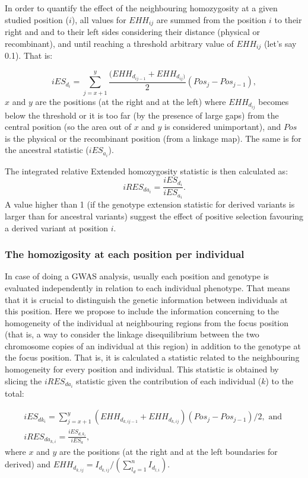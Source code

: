 \documentclass[a4paper,11pt]{article}
\begin{document}
In order to quantify the effect of the neighbouring homozygosity at a given studied position ($i$),  all values for $EHH_{ij}$ are summed from the position $i$ to their right and and to their left sides considering their distance (physical or recombinant), and until reaching a threshold arbitrary value of $EHH_{ij}$ (let's say 0.1). That is: 

\begin{equation}
 iES_{d_i} = \sum_{j=x+1}^{y}\frac{(EHH_{d_{ij-1}} + EHH_{d_{ij})}}{2} (Pos_{j} - Pos_{j-1}),
 \end{equation}
 $x$ and $y$ are the positions (at the right and at the left) where $EHH_{d_{ij}}$ becomes below the threshold or it is too far (by the presence of large gaps) from the central position (so the area out of $x$ and $y$ is considered unimportant), and $Pos$ is the physical or the recombinant position (from a linkage map). The same is for the ancestral statistic ($iES_{a_i}$).

The integrated relative Extended homozygosity statistic is then calculated as:
 \begin{equation}
 iRES_{da_{i}} = \frac{iES_{d_{i}}} {iES_{a_{i}}}.
 \end{equation}
A value higher than 1 (if the genotype extension statistic for derived variants is larger than for ancestral variants) suggest the effect of positive selection favouring a derived variant at position $i$.  

\subsubsection{The homozigosity at each position per individual}
In case of doing a GWAS analysis, usually each position and genotype is evaluated independently in relation to each individual phenotype. That means that it is crucial to distinguish the genetic information between individuals at this position. Here we propose to include the information concerning to the homogeneity of the individual at neighbouring regions from the focus position (that is, a way to consider the linkage disequilibrium between the two chromosome copies of an individual at this region) in addition to the genotype at the focus position. That is, it is calculated a statistic related to the neighbouring homogeneity for every position and individual. This statistic is obtained by slicing the $iRES_{da_i}$ statistic given the contribution of each individual ($k$) to the total:

\begin{equation}
\begin{split}
iES_{dk_i} = \sum_{j=x+1}^{y}(EHH_{d_{k,ij-1}}+ EHH_{d_{k,ij}})(Pos_{j} - Pos_{j-1}) / 2, \text{ and }\\ 
iRES_{da_{k,i}} =  \frac{iES_{d,k_i}}{iES_{a}},
\end{split}
\end{equation}
where $x$ and $y$ are the positions (at the right and at the left boundaries for derived) and $EHH_{d_{k,ij}} = I_{d_{k,ij}} / (\sum_{l_d=1}^{n}I_{d_{l,i}})$. 
\end{document}
